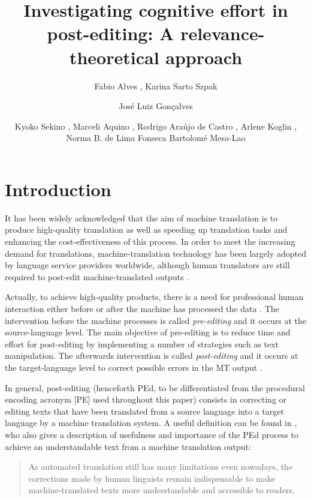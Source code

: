 \documentclass[output=paper]{langsci/langscibook}
\author{%
Fabio Alves{\ufmg}%
, 
Karina Sarto Szpak{\ufmg}%
\affiliation{UFMG}%
\and
José Luiz Gonçalves{\ufop}%
\affiliation{UFOP}%
\and
Kyoko Sekino{\ufmg}%
,
Marceli Aquino{\ufmg}%
,
Rodrigo Araújo de Castro{\ufmg}%
,
{Arlene} Koglin{\ufmg}%
,
Norma B. de Lima Fonseca{\ufmg}%
\affiliation{UFMG}%
 \lastand
Bartolomé Mesa-Lao{\cbs}
\affiliation{CBS}%
}
\title{Investigating cognitive effort in post-editing: {A} relevance-theoretical approach}
\begin{document}
\section{Introduction}

It has been widely acknowledged that the aim of machine translation is to produce high-quality translation as well as speeding up translation tasks and enhancing the cost-effectiveness of this process. In order to meet the increasing demand for translations, machine-translation technology has been largely adopted by language service providers worldwide, although human translators are still required to post-edit machine-translated outputs \citep[p. 17]{almeida2013}. 


Actually, to achieve high-quality products, there is a need for professional human interaction either before or after the machine has processed the data \citep[p. 3]{obrien2004}. The intervention before the machine processes is called \textit{pre-editing} and it occurs at the source-language level. The main objective of pre-editing is to reduce time and effort for post-editing by implementing a number of strategies such as text manipulation. The afterwards intervention is called \textit{post-editing} and it occurs at the target-language level to correct possible errors in the MT output \citep{MesaLao2013}. 



In general, post-editing (henceforth PEd, to be differentiated from the procedural encoding acronym [PE] used throughout this paper) consists in correcting or editing texts that have been translated from a source language into a target language by a machine translation system. A useful definition can be found in \citet{Somers2001}, who also gives a description of usefulness and importance of the PEd process to achieve an understandable text from a machine translation output: 


\begin{quote}
As automated translation still has many limitations even nowadays, the corrections made by human linguists remain indispensable to make machine-translated texts more understandable and accessible to readers. \citep[p. 138]{Somers2001}
\end{quote}
\end{document}
